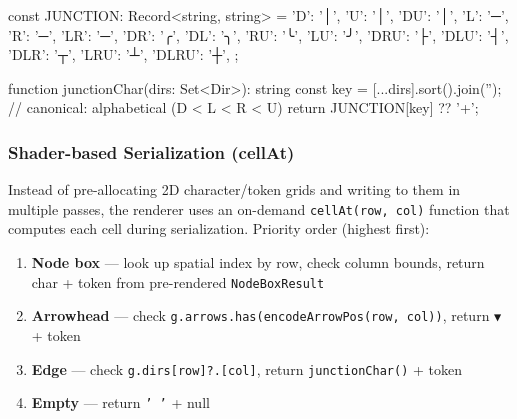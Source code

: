 \begin{CodeBlock}
const JUNCTION: Record<string, string> = {
  'D': '│',  'U': '│',  'DU': '│',
  'L': '─',  'R': '─',  'LR': '─',
  'DR': '╭', 'DL': '╮', 'RU': '╰', 'LU': '╯',
  'DRU': '├', 'DLU': '┤', 'DLR': '┬', 'LRU': '┴',
  'DLRU': '┼',
};

function junctionChar(dirs: Set<Dir>): string {
  const key = [...dirs].sort().join('');   // canonical: alphabetical (D < L < R < U)
  return JUNCTION[key] ?? '+';
}
\end{CodeBlock}

\subsubsection{Shader-based Serialization (cellAt)}\label{record-426-shader-based-serialization-cellat}

Instead of pre-allocating 2D character/token grids and writing to them in multiple passes, the renderer uses an on-demand \texttt{c\allowbreak{}e\allowbreak{}l\allowbreak{}l\allowbreak{}A\allowbreak{}t\allowbreak{}(\allowbreak{}r\allowbreak{}o\allowbreak{}w\allowbreak{},\allowbreak{} \allowbreak{}c\allowbreak{}o\allowbreak{}l\allowbreak{})} function that computes each cell during serialization. Priority order (highest first):

\begin{enumerate}
\def\labelenumi{\arabic{enumi}.}
\tightlist
\item
  \textbf{Node box} --- look up spatial index by row, check column bounds, return char + token from pre-rendered \texttt{N\allowbreak{}o\allowbreak{}d\allowbreak{}e\allowbreak{}B\allowbreak{}o\allowbreak{}x\allowbreak{}R\allowbreak{}e\allowbreak{}s\allowbreak{}u\allowbreak{}l\allowbreak{}t}
\item
  \textbf{Arrowhead} --- check \texttt{g\allowbreak{}.\allowbreak{}a\allowbreak{}r\allowbreak{}r\allowbreak{}o\allowbreak{}w\allowbreak{}s\allowbreak{}.\allowbreak{}h\allowbreak{}a\allowbreak{}s\allowbreak{}(\allowbreak{}e\allowbreak{}n\allowbreak{}c\allowbreak{}o\allowbreak{}d\allowbreak{}e\allowbreak{}A\allowbreak{}r\allowbreak{}r\allowbreak{}o\allowbreak{}w\allowbreak{}P\allowbreak{}o\allowbreak{}s\allowbreak{}(\allowbreak{}r\allowbreak{}o\allowbreak{}w\allowbreak{},\allowbreak{} \allowbreak{}c\allowbreak{}o\allowbreak{}l\allowbreak{})\allowbreak{})}, return \texttt{▼} + token
\item
  \textbf{Edge} --- check \texttt{g\allowbreak{}.\allowbreak{}d\allowbreak{}i\allowbreak{}r\allowbreak{}s\allowbreak{}[\allowbreak{}r\allowbreak{}o\allowbreak{}w\allowbreak{}]\allowbreak{}?\allowbreak{}.\allowbreak{}[\allowbreak{}c\allowbreak{}o\allowbreak{}l\allowbreak{}]}, return \texttt{j\allowbreak{}u\allowbreak{}n\allowbreak{}c\allowbreak{}t\allowbreak{}i\allowbreak{}o\allowbreak{}n\allowbreak{}C\allowbreak{}h\allowbreak{}a\allowbreak{}r\allowbreak{}(\allowbreak{})} + token
\item
  \textbf{Empty} --- return \texttt{'\allowbreak{} \allowbreak{}'} + null
\end{enumerate}

